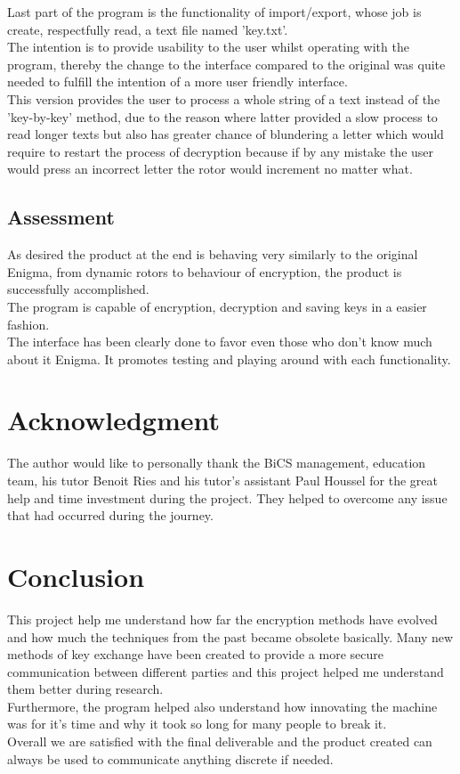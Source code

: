 \documentclass[conference,compsoc]{IEEEtran}
\begin{document}
Last part of the program is the functionality of import/export, whose job is create, respectfully read, a text file named 'key.txt'.\\

The intention is to provide usability to the user whilst operating with the program, thereby the change to the interface compared to the original was quite needed to fulfill the intention of a more user friendly interface.\\
This version provides the user to process a whole string of a text instead of the 'key-by-key' method, due to the reason where latter provided a slow process to read longer texts but also has greater chance of blundering a letter which would require to restart the process of decryption because if by any mistake the user would press an incorrect letter the rotor would increment no matter what.\\

\subsection{Assessment}
As desired the product at the end is behaving very similarly to the original Enigma, from dynamic rotors to behaviour of encryption, the product is successfully accomplished.\\
The program is capable of encryption, decryption and saving keys in a easier fashion.\\
The interface has been clearly done to favor even those who don't know much about it Enigma. It promotes testing and playing around with each functionality.\\


\section*{Acknowledgment}
The author would like to personally thank the BiCS management, education team, his tutor Benoit Ries and his tutor's assistant Paul Houssel for the great help and time investment during the project. They helped to overcome any issue that had occurred during the journey.


\section{Conclusion}

This project help me understand how far the encryption methods have evolved and how much the techniques from the past became obsolete basically. Many new methods of key exchange have been created to provide a more secure communication between different parties and this project helped me understand them better during research.\\   
Furthermore, the program helped also understand how innovating the machine was for it's time and why it took so long for many people to break it.\\
Overall we are satisfied with the final deliverable and the product created can always be used to communicate anything discrete if needed.\\
\end{document}
